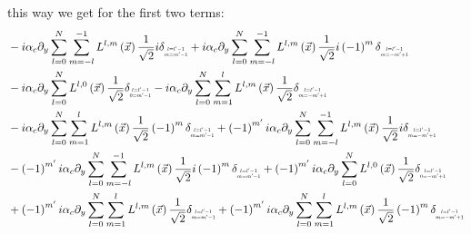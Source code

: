 \documentclass[10pt]{scrartcl}
\begin{document}
this way we get for the first two terms:
\begin{align*}
&-i\alpha_c\partial_y
\sum_{l=0}^{N}
\sum_{m=-l}^{-1}L^{l,m}\left (\vec{x}\right)
\frac{1}{\sqrt{2}}
i\delta_{\scaleto{\substack{l=l'-1\\m=m'-1}}{9pt}}
+i\alpha_c\partial_y
\sum_{l=0}^{N}
\sum_{m=-l}^{-1}L^{l,m}\left (\vec{x}\right)
\frac{1}{\sqrt{2}}
i
\left({-1}\right)^{m}
\delta_{\scaleto{\substack{l=l'-1\\m=-m'+1}}{9pt}}
\\&
-i\alpha_c\partial_y
\sum_{l=0}^{N}
L^{l,0}\left (\vec{x}\right)
\frac{1}{\sqrt{2}}
\delta_{\scaleto{\substack{l=l'-1\\0=m'-1}}{9pt}}
-i\alpha_c\partial_y
\sum_{l=0}^{N}
\sum_{m=1}^{l}L^{l,m}\left (\vec{x}\right)
\frac{1}{\sqrt{2}}
\delta_{\scaleto{\substack{l=l'-1\\m=-m'+1}}{9pt}}
\\&
-i\alpha_c\partial_y
\sum_{l=0}^{N}
\sum_{m=1}^{l}L^{l,m}\left (\vec{x}\right)
\frac{1}{\sqrt{2}}
\left({-1}\right)^{m}
\delta_{\scaleto{\substack{l=l'-1\\m=m'-1}}{9pt}}
+\left({-1}\right)^{m'}i\alpha_c\partial_y
\sum_{l=0}^{N}
\sum_{m=-l}^{-1}L^{l,m}\left (\vec{x}\right)
\frac{1}{\sqrt{2}}
i
\delta_{\scaleto{\substack{l=l'-1\\m=-m'+1}}{9pt}}
\\&
-\left({-1}\right)^{m'}i\alpha_c\partial_y
\sum_{l=0}^{N}
\sum_{m=-l}^{-1}L^{l,m}\left (\vec{x}\right)
\frac{1}{\sqrt{2}}
i
\left({-1}\right)^{m}
\delta_{\scaleto{\substack{l=l'-1\\m=m'-1}}{9pt}}
+
\left({-1}\right)^{m'}i\alpha_c\partial_y
\sum_{l=0}^{N}
L^{l,0}\left (\vec{x}\right)
\frac{1}{\sqrt{2}}
\delta_{\scaleto{\substack{l=l'-1\\0=-m'+1}}{9pt}}
\\&
+
\left({-1}\right)^{m'}i\alpha_c\partial_y
\sum_{l=0}^{N}
\sum_{m=1}^{l}L^{l,m}\left (\vec{x}\right)
\frac{1}{\sqrt{2}}
\delta_{\scaleto{\substack{l=l'-1\\m=m'-1}}{9pt}}
+
\left({-1}\right)^{m'}i\alpha_c\partial_y
\sum_{l=0}^{N}
\sum_{m=1}^{l}L^{l,m}\left (\vec{x}\right)
\frac{1}{\sqrt{2}}
\left({-1}\right)^{m}
\delta_{\scaleto{\substack{l=l'-1\\m=-m'+1}}{9pt}}
\end{align*}
\end{document}
